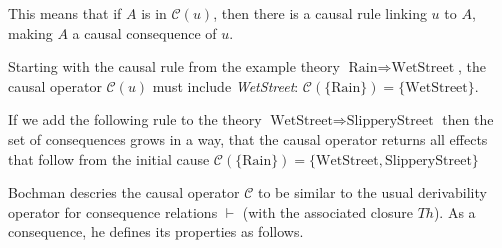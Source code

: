 \documentclass[seminar,palatino,english]{AIGpaper}
\begin{document}
This means that if $ A $ is in $ \mathcal{C}(u) $, then there is a causal rule linking $ u $ to $ A $, making $ A $ a causal consequence of $ u $.


\begin{tcolorbox}[colframe=black!40, colback=gray!10, title=\textbf{Example: $ u = \{\text{Rain}\} $}]

Starting with the causal rule from the example theory $ \text{Rain} \Rightarrow \text{WetStreet} $, the causal operator $ \mathcal{C}(u) $ must include \textit{WetStreet}: $\mathcal{C}(\{\text{Rain}\}) = \{\text{WetStreet}\} $.

If we add the following rule to the theory $ \text{WetStreet} \Rightarrow \text{SlipperyStreet} $
then the set of consequences grows in a way, that the causal operator returns all effects that follow from the initial cause $ \mathcal{C}(\{\text{Rain}\}) = \{\text{WetStreet}, \text{SlipperyStreet}\} $

\end{tcolorbox}

Bochman descries the causal operator $\mathcal{C}$ to be similar to the \glqq{}usual derivability operator for consequence relations\grqq{} $\vdash$ (with the associated closure $Th$). As a consequence, he defines its properties as follows.
\end{document}
